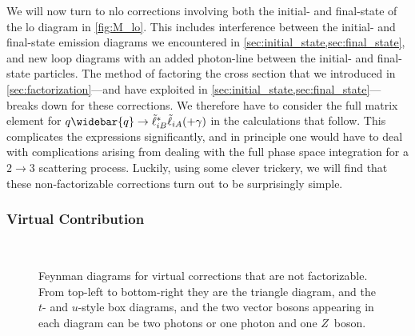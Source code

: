 We will now turn to \gls{nlo} corrections involving both the initial- and final-state of the \gls{lo} diagram in \cref{fig:M_lo}.
This includes interference between the initial- and final-state emission diagrams we encountered in \cref{sec:initial_state,sec:final_state}, and new loop diagrams with an added photon-line between the initial- and final-state particles.
The method of factoring the cross section that we introduced in \cref{sec:factorization}---and have exploited in \cref{sec:initial_state,sec:final_state}---breaks down for these corrections.
We therefore have to consider the full matrix element for $q\widebar{q} \to \slepton_{iB}^*\slepton_{iA}(+\gamma)$ in the calculations that follow.
This complicates the expressions significantly, and in principle one would have to deal with complications arising from dealing with the full phase space integration for a $2\to3$ scattering process.
Luckily, using some clever trickery, we will find that these non-factorizable corrections turn out to be surprisingly simple.


\subsubsection{Virtual Contribution}

\begin{figure}
    \centering
    \begin{subfigure}[b]{0.8\linewidth}
        \centering
        \caption{}
        \label{fig:ifs_triangle}
    \end{subfigure}
    \\
    \begin{subfigure}[b]{0.45\linewidth}
        \centering
        \caption{}
        \label{fig:ifs_box_t}
    \end{subfigure}
    \begin{subfigure}[b]{0.45\linewidth}
        \centering
        \caption{}
        \label{fig:ifs_box_u}
    \end{subfigure}
    \caption{Feynman diagrams for virtual corrections that are not factorizable. From top-left to bottom-right they are the triangle diagram, and the $t$- and $u$-style box diagrams, and the two vector bosons appearing in each diagram can be two photons or one photon and one $Z$~boson.}
    \label{fig:interference_diagrams}
\end{figure}

